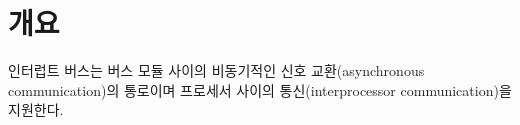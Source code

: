 \section{개요}
인터럽트 버스는 버스 모듈 사이의 비동기적인 신호 교환(asynchronous
communication)의 통로이며 프로세서 사이의 통신(interprocessor
communication)을 지원한다.
%

%
